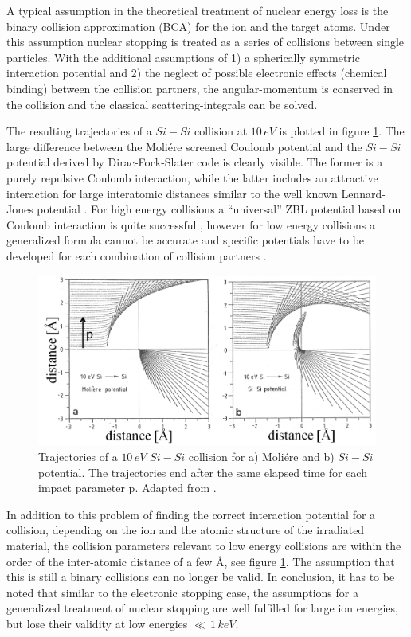 A typical assumption in the theoretical treatment of nuclear energy loss is the binary collision approximation (BCA) for the ion and the target atoms. Under this assumption nuclear stopping is treated as a series of collisions between single particles. With the additional assumptions of 1) a spherically symmetric interaction potential and 2) the neglect of possible electronic effects (chemical binding) between the collision partners, the angular-momentum is conserved in the collision and the classical scattering-integrals can be solved. 

The resulting trajectories of a $Si-Si$ collision at $10\,eV$ is plotted in figure \ref{SiSi}. The large difference between the Moliére screened Coulomb potential and the $Si-Si$ potential derived by Dirac-Fock-Slater code is clearly visible. The former is a purely repulsive Coulomb interaction, while the latter includes an attractive interaction for large interatomic distances similar to the well known Lennard-Jones potential \cite{eckstein_computer_1991}. For high energy collisions a ``universal'' ZBL potential based on Coulomb interaction is quite successful \cite{ziegler_stopping_1985}, however for low energy collisions a generalized formula cannot be accurate and specific potentials have to be developed for each combination of collision partners \cite{dedkov_interatomic_1995,nordlund_repulsive_1997,albe_modeling_2002,nordlund_interatomic_2008}.

\begin{figure}
	\centering
		\includegraphics[width=.6\textwidth]{images/SiSicollision.jpg}
	\caption{Trajectories of a $10\,eV$ $Si-Si$ collision for a) Moliére and b) $Si-Si$ potential. The trajectories end after the same elapsed time for each impact parameter p. Adapted from \cite{eckstein_computer_1991}.}
	\label{SiSi}
\end{figure} 

In addition to this problem of finding the correct interaction potential for a collision, depending on the ion and the atomic structure of the irradiated material, the collision parameters relevant to low energy collisions are within the order of the inter-atomic distance of a few \AA, see figure \ref{SiSi}. The assumption that this is still a binary collisions can no longer be valid. In conclusion, it has to be noted that similar to the electronic stopping case, the assumptions for a generalized treatment of nuclear stopping are well fulfilled for large ion energies, but lose their validity at low energies $\ll\,1\,keV$.

